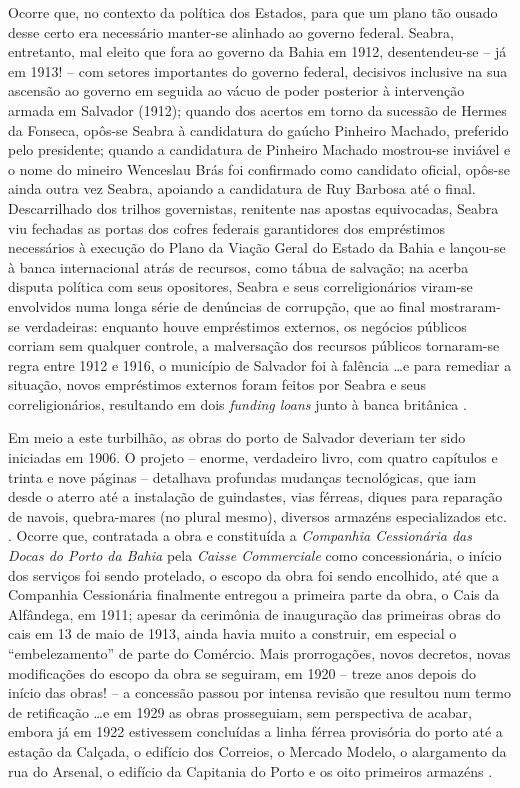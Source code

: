 Ocorre que, no contexto da política dos Estados, para que um plano tão ousado desse certo era necessário manter-se alinhado ao governo federal. Seabra, entretanto, mal eleito que fora ao governo da Bahia em 1912, desentendeu-se -- já em 1913! -- com setores importantes do governo federal, decisivos inclusive na sua ascensão ao governo em seguida ao vácuo de poder posterior à intervenção armada em Salvador (1912); quando dos acertos em torno da sucessão de Hermes da Fonseca, opôs-se Seabra à candidatura do gaúcho Pinheiro Machado, preferido pelo presidente; quando a candidatura de Pinheiro Machado mostrou-se inviável e o nome do mineiro Wenceslau Brás foi confirmado como candidato oficial, opôs-se ainda outra vez Seabra, apoiando a candidatura de Ruy Barbosa até o final. Descarrilhado dos trilhos governistas, renitente nas apostas equivocadas, Seabra viu fechadas as portas dos cofres federais garantidores dos empréstimos necessários à execução do Plano da Viação Geral do Estado da Bahia e lançou-se à banca internacional atrás de recursos, como tábua de salvação; na acerba disputa política com seus opositores, Seabra e seus correligionários viram-se envolvidos numa longa série de denúncias de corrupção, que ao final mostraram-se verdadeiras: enquanto houve empréstimos externos, os negócios públicos corriam sem qualquer controle, a malversação dos recursos públicos tornaram-se regra entre 1912 e 1916, o município de Salvador foi à falência \dots e para remediar a situação, novos empréstimos externos foram feitos por Seabra e seus correligionários, resultando em dois \textit{funding loans} junto à banca britânica \cite[pp.~217-221]{joaci_porto_2016}.

Em meio a este turbilhão, as obras do porto de Salvador deveriam ter sido iniciadas em 1906. O projeto -- enorme, verdadeiro livro, com quatro capítulos e trinta e nove páginas -- detalhava profundas mudanças tecnológicas, que iam desde o aterro até a instalação de guindastes, vias férreas, diques para reparação de navois, quebra-mares (no plural mesmo), diversos armazéns especializados etc. \cite[p.~186]{rosado_porto_2016}. Ocorre que, contratada a obra e constituída a \textit{Companhia Cessionária das Docas do Porto da Bahia} pela \textit{Caisse Commerciale} como concessionária, o início dos serviços foi sendo protelado, o escopo da obra foi sendo encolhido, até que a Companhia Cessionária finalmente entregou a primeira parte da obra, o Cais da Alfândega, em 1911; apesar da cerimônia de inauguração das primeiras obras do cais em 13 de maio de 1913, ainda havia muito a construir, em especial o ``embelezamento'' de parte do Comércio. Mais prorrogações, novos decretos, novas modificações do escopo da obra se seguiram, em 1920 -- treze anos depois do início das obras! -- a concessão passou por intensa revisão que resultou num termo de retificação \dots e em 1929 as obras prosseguiam, sem perspectiva de acabar, embora já em 1922 estivessem concluídas a linha férrea provisória do porto até a estação da Calçada, o edifício dos Correios, o Mercado Modelo, o alargamento da rua do Arsenal, o edifício da Capitania do Porto e os oito primeiros armazéns \cite[p.~186-196]{rosado_porto_2016}. 

